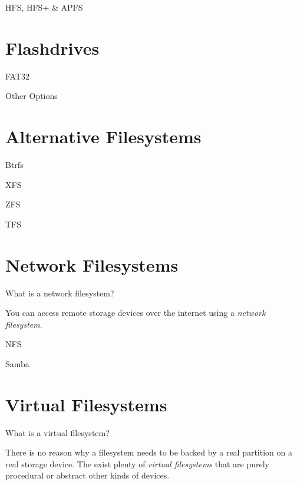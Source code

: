 \documentclass{lug}
\begin{document}
\begin{frame}{HFS, HFS+ \& APFS}
\end{frame}

\section{Flashdrives}
\begin{frame}{FAT32}
\end{frame}

\begin{frame}{Other Options}
\end{frame}

\section{Alternative Filesystems}
\begin{frame}{Btrfs}
\end{frame}

\begin{frame}{XFS}
\end{frame}

\begin{frame}{ZFS}
\end{frame}

\begin{frame}{TFS}
\end{frame}

\section{Network Filesystems}
\begin{frame}{What is a network filesystem?}
\begin{center}
    You can access remote storage devices over the internet using a
    \emph{network filesystem}.
\end{center}
\end{frame}

\begin{frame}{NFS}
\end{frame}

\begin{frame}{Samba}
\end{frame}

\section{Virtual Filesystems}
\begin{frame}{What is a virtual filesystem?}
\begin{center}
    There is no reason why a filesystem needs to be backed by a real partition
    on a real storage device. The exist plenty of \emph{virtual filesystems}
    that are purely procedural or abstract other kinds of devices.
\end{center}
\end{frame}
\end{document}
